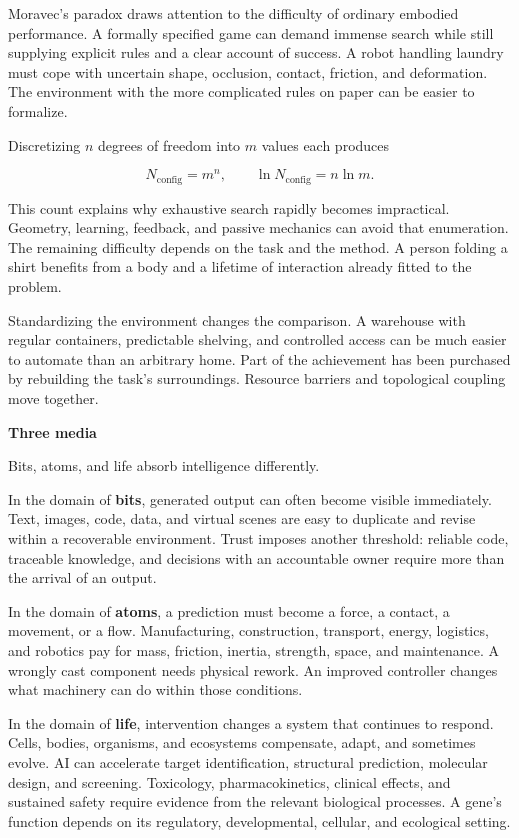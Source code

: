 \documentclass[11pt,openany]{book}
\newcommand{\term}[1]{\textbf{#1}}
\newcommand{\subhead}[1]{\par\medskip\noindent\textbf{#1}\par\nobreak\smallskip}
\begin{document}
Moravec's paradox draws attention to the difficulty of ordinary embodied performance. A formally specified game can demand immense search while still supplying explicit rules and a clear account of success. A robot handling laundry must cope with uncertain shape, occlusion, contact, friction, and deformation. The environment with the more complicated rules on paper can be easier to formalize.

Discretizing $n$ degrees of freedom into $m$ values each produces

\begin{equation}
N_{\mathrm{config}}=m^n,
\qquad
\ln N_{\mathrm{config}}=n\ln m.
\end{equation}

This count explains why exhaustive search rapidly becomes impractical. Geometry, learning, feedback, and passive mechanics can avoid that enumeration. The remaining difficulty depends on the task and the method. A person folding a shirt benefits from a body and a lifetime of interaction already fitted to the problem.

Standardizing the environment changes the comparison. A warehouse with regular containers, predictable shelving, and controlled access can be much easier to automate than an arbitrary home. Part of the achievement has been purchased by rebuilding the task's surroundings. Resource barriers and topological coupling move together.

\subhead{Three media}

Bits, atoms, and life absorb intelligence differently.

In the domain of \term{bits}, generated output can often become visible immediately. Text, images, code, data, and virtual scenes are easy to duplicate and revise within a recoverable environment. Trust imposes another threshold: reliable code, traceable knowledge, and decisions with an accountable owner require more than the arrival of an output.

In the domain of \term{atoms}, a prediction must become a force, a contact, a movement, or a flow. Manufacturing, construction, transport, energy, logistics, and robotics pay for mass, friction, inertia, strength, space, and maintenance. A wrongly cast component needs physical rework. An improved controller changes what machinery can do within those conditions.

In the domain of \term{life}, intervention changes a system that continues to respond. Cells, bodies, organisms, and ecosystems compensate, adapt, and sometimes evolve. AI can accelerate target identification, structural prediction, molecular design, and screening. Toxicology, pharmacokinetics, clinical effects, and sustained safety require evidence from the relevant biological processes. A gene's function depends on its regulatory, developmental, cellular, and ecological setting.
\end{document}
